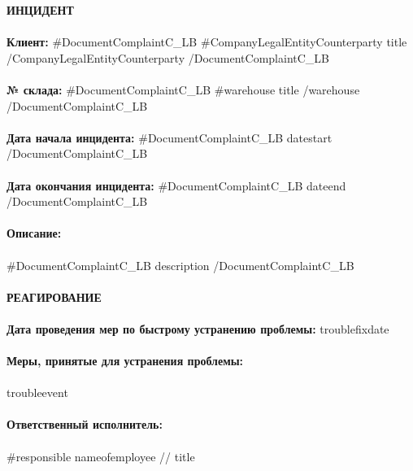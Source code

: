 {{{{{{{\noindent \textbf{ИНЦИДЕНТ} \\
\vspace{1mm} \\
\textbf{Клиент:} {{#DocumentComplaintC_LB}} {{#CompanyLegalEntityCounterparty}} {{title}} {{/CompanyLegalEntityCounterparty}} {{/DocumentComplaintC_LB}}  \\
\vspace{1mm} \\
\textbf{№ склада:}  {{#DocumentComplaintC_LB}}  {{#warehouse}} {{title}} {{/warehouse}} {{/DocumentComplaintC_LB}}   \\
\vspace{1mm} \\
\textbf{Дата начала инцидента:} {{#DocumentComplaintC_LB}} {{datestart}}  {{/DocumentComplaintC_LB}}  \\
\vspace{1mm} \\
\textbf{Дата окончания инцидента:}  {{#DocumentComplaintC_LB}} {{dateend}}  {{/DocumentComplaintC_LB}}  \\
\vspace{1mm} \\
\textbf{Описание:} \\
\vspace{1mm} \\
{{#DocumentComplaintC_LB}} {{description}} {{/DocumentComplaintC_LB}}  \\
\vspace{7mm} \\
\noindent\textbf{РЕАГИРОВАНИЕ} \\
\vspace{1mm} \\
\noindent\textbf{Дата проведения мер по быстрому устранению проблемы:} {{troublefixdate}}  \\
\vspace{1mm} \\
\noindent\textbf{Меры, принятые для устранения проблемы:} \\
\vspace{1mm} \\
 {{troubleevent}} \\
 \vspace{1mm} \\
\noindent\textbf{Ответственный исполнитель:} \\
\vspace{1mm} \\
{{#responsible}}
 {{nameofemployee}} // {{title}}  \\
}}}}}}}
